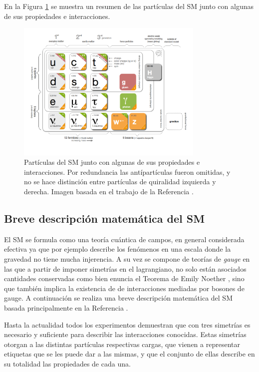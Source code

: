 En la Figura \ref{fig:sm_particles} se muestra un resumen de las partículas del SM junto con algunas de sus propiedades e interacciones.

\begin{figure}
  \centering
  \includegraphics[width=0.8\textwidth]{images/sm_particles.png}
  \caption{Partículas del SM junto con algunas de sus propiedades e interacciones. Por redundancia las antípartículas fueron omitidas, y no se hace distinción entre partículas de quiralidad izquierda y derecha. Imagen basada en el trabajo de la Referencia \cite{fig_sm_particles}.}
  \label{fig:sm_particles}
\end{figure}


\subsection{Breve descripción matemática del SM}

El SM se formula como una teoría cuántica de campos, en general considerada efectiva ya que por ejemplo describe los fenómenos en una escala donde la gravedad no tiene mucha injerencia. A su vez se compone de teorías de \textit{gauge} en las que a partir de imponer simetrías en el lagrangiano, no solo están asociados cantidades conservadas como bien enuncia el Teorema de Emily Noether \cite{noether}, sino que también implica la existencia de de interacciones mediadas por bosones de gauge. A continuación se realiza una breve descripción matemática del SM basada principalmente en la Referencia \cite{gkane}.

Hasta la actualidad todos los experimentos demuestran que con tres simetrías es necesario y suficiente para describir las interacciones conocidas. Estas simetrías otorgan a las distintas partículas respectivas cargas, que vienen a representar etiquetas que se les puede dar a las mismas, y que el conjunto de ellas describe en su totalidad las propiedades de cada una.

